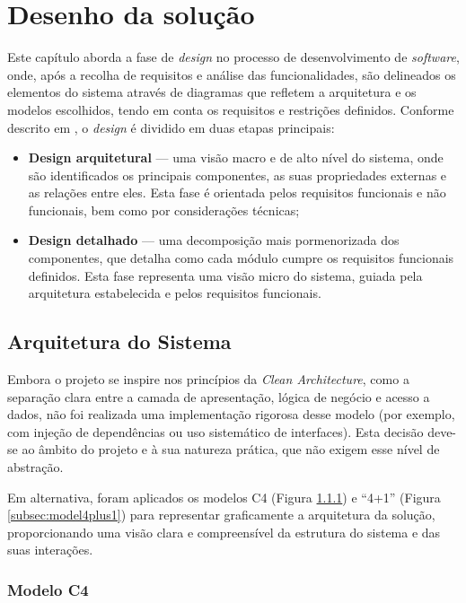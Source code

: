 \chapter{Desenho da solução}

Este capítulo aborda a fase de \textit{design} no processo de desenvolvimento de \textit{software}, onde, após a recolha de requisitos e análise das funcionalidades, são delineados os elementos do sistema através de diagramas que refletem a arquitetura e os modelos escolhidos, tendo em conta os requisitos e restrições definidos. Conforme descrito em \cite{tsui2022essentials}, o \textit{design} é dividido em duas etapas principais:

\begin{itemize}
    \item \textbf{Design arquitetural} — uma visão macro e de alto nível do sistema, onde são identificados os principais componentes, as suas propriedades externas e as relações entre eles. Esta fase é orientada pelos requisitos funcionais e não funcionais, bem como por considerações técnicas;
    \item \textbf{Design detalhado} — uma decomposição mais pormenorizada dos componentes, que detalha como cada módulo cumpre os requisitos funcionais definidos. Esta fase representa uma visão micro do sistema, guiada pela arquitetura estabelecida e pelos requisitos funcionais.
\end{itemize}



\section{Arquitetura do Sistema} 

Embora o projeto se inspire nos princípios da \textit{Clean Architecture}, como a separação clara entre a camada de apresentação, lógica de negócio e acesso a dados, não foi realizada uma implementação rigorosa desse modelo (por exemplo, com injeção de dependências ou uso sistemático de interfaces). Esta decisão deve-se ao âmbito do projeto e à sua natureza prática, que não exigem esse nível de abstração.

Em alternativa, foram aplicados os modelos C4 (Figura \ref{subsec:modelC4}) e “4+1” (Figura \ref{subsec:model4plus1}) para representar graficamente a arquitetura da solução, proporcionando uma visão clara e compreensível da estrutura do sistema e das suas interações.


\subsection{Modelo C4}
\label{subsec:modelC4}

